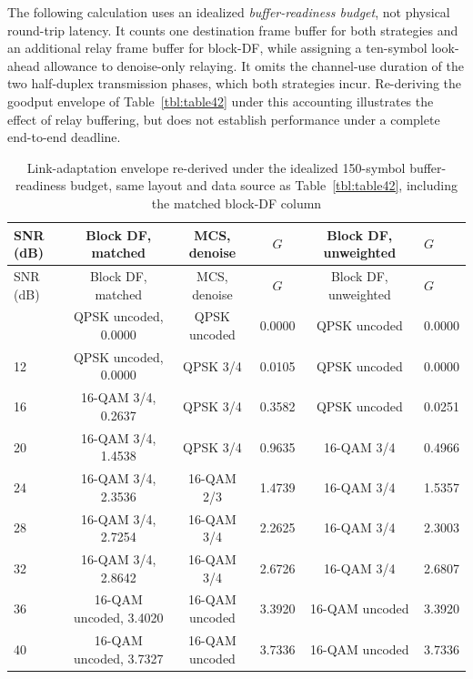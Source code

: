 The following calculation uses an idealized \emph{buffer-readiness budget}, not physical round-trip latency. It counts one destination frame buffer for both strategies and an additional relay frame buffer for block-DF, while assigning a ten-symbol look-ahead allowance to denoise-only relaying. It omits the channel-use duration of the two half-duplex transmission phases, which both strategies incur. Re-deriving the goodput envelope of Table~\ref{tbl:table42} under this accounting illustrates the effect of relay buffering, but does not establish performance under a complete end-to-end deadline.

\enlargethispage{3pt}
{\small\setlength{\tabcolsep}{3pt}\begin{longtable}[]{@{}lccccl@{}}
\caption[Link-adaptation envelope under a 150-symbol readiness budget]{Link-adaptation envelope re-derived under the idealized 150-symbol buffer-readiness budget, same layout and data source as Table~\ref{tbl:table42}, including the matched block-DF column}\label{tbl:table43}\tabularnewline
\toprule\noalign{}
SNR (dB) & Block DF, matched & MCS, denoise & $G$ & Block DF, unweighted & $G$ \\
\midrule\noalign{}
\endfirsthead
\toprule\noalign{}
SNR (dB) & Block DF, matched & MCS, denoise & $G$ & Block DF, unweighted & $G$ \\
\midrule\noalign{}
\endhead
\bottomrule\noalign{}
\endlastfoot
8 & QPSK uncoded, 0.0000 & QPSK uncoded & 0.0000 & QPSK uncoded & 0.0000 \\
12 & QPSK uncoded, 0.0000 & QPSK 3/4 & 0.0105 & QPSK uncoded & 0.0000 \\
16 & 16-QAM 3/4, 0.2637 & QPSK 3/4 & 0.3582 & QPSK uncoded & 0.0251 \\
20 & 16-QAM 3/4, 1.4538 & QPSK 3/4 & 0.9635 & 16-QAM 3/4 & 0.4966 \\
24 & 16-QAM 3/4, 2.3536 & 16-QAM 2/3 & 1.4739 & 16-QAM 3/4 & 1.5357 \\
28 & 16-QAM 3/4, 2.7254 & 16-QAM 3/4 & 2.2625 & 16-QAM 3/4 & 2.3003 \\
32 & 16-QAM 3/4, 2.8642 & 16-QAM 3/4 & 2.6726 & 16-QAM 3/4 & 2.6807 \\
36 & 16-QAM uncoded, 3.4020 & 16-QAM uncoded & 3.3920 & 16-QAM uncoded & 3.3920 \\
40 & 16-QAM uncoded, 3.7327 & 16-QAM uncoded & 3.7336 & 16-QAM uncoded & 3.7336 \\
\end{longtable}}



